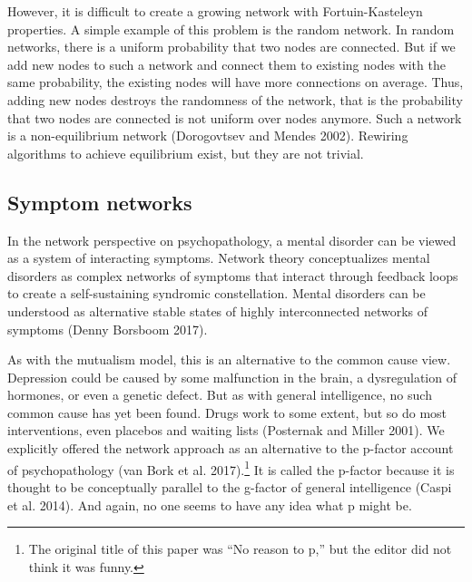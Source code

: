 \documentclass[
  letterpaper,
]{scrbook}
\begin{document}
However, it is difficult to create a growing network with
Fortuin-Kasteleyn properties. A simple example of this problem is the
random network. In random networks, there is a uniform probability that
two nodes are connected. But if we add new nodes to such a network and
connect them to existing nodes with the same probability, the existing
nodes will have more connections on average. Thus, adding new nodes
destroys the randomness of the network, that is the probability that two
nodes are connected is not uniform over nodes anymore. Such a network is
a non-equilibrium network (Dorogovtsev and Mendes 2002). Rewiring
algorithms to achieve equilibrium exist, but they are not trivial.

\hypertarget{symptom-networks}{%
\subsection{Symptom networks}\label{symptom-networks}}

In the network perspective on psychopathology, a mental disorder can be
viewed as a system of interacting symptoms. Network theory
conceptualizes mental disorders as complex networks of symptoms that
interact through feedback loops to create a self-sustaining syndromic
constellation. Mental disorders can be understood as alternative stable
states of highly interconnected networks of symptoms (Denny Borsboom
2017).

As with the mutualism model, this is an alternative to the common cause
view. Depression could be caused by some malfunction in the brain, a
dysregulation of hormones, or even a genetic defect. But as with general
intelligence, no such common cause has yet been found. Drugs work to
some extent, but so do most interventions, even placebos and waiting
lists (Posternak and Miller 2001). We explicitly offered the network
approach as an alternative to the p-factor account of psychopathology
(van Bork et al. 2017).\footnote{The original title of this paper was
  ``No reason to p,'' but the editor did not think it was funny.} It is
called the p-factor because it is thought to be conceptually parallel to
the g-factor of general intelligence (Caspi et al. 2014). And again, no
one seems to have any idea what p might be.
\end{document}
